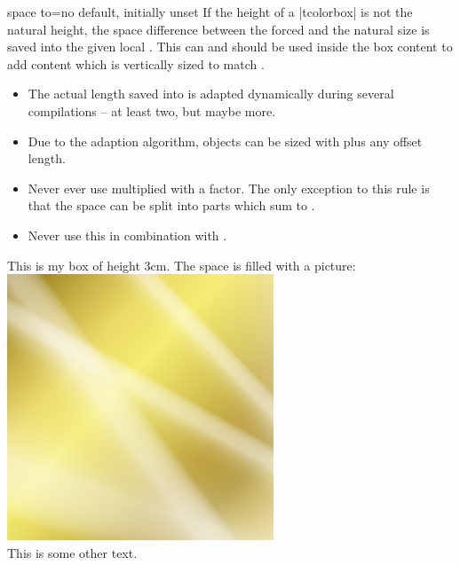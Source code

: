 \begin{docTcbKey}[][doc new=2015-02-15]{space to}{=}{no default, initially unset}
  If the height of a |tcolorbox| is not the natural height, the space
  difference between the forced and the natural size is saved into the
  given local . This  can and should be used inside
  the box content to add content which is vertically sized to match .
  \begin{marker}
    \begin{itemize}
    \item The actual length saved into  is adapted dynamically
      during several compilations -- at least two, but maybe more.
    \item Due to the adaption algorithm, objects can be sized with
       plus any offset length.
    \item Never ever use  multiplied with a factor. The only
      exception to this rule is that the space can be split into parts which
      sum to .
    \item Never use this in combination with .
    \end{itemize}
  \end{marker}
\begin{dispExample}
\begin{tcolorbox}[colframe=blue!75!black,colback=white,height=3cm,
    space to=\myspace]
  This is my box of height 3cm. The space is filled with a picture:\\[2mm]
  \includegraphics[width=\linewidth,height=\myspace]{goldshade.png}\\[1mm]
  This is some other text.
\end{tcolorbox}
\end{dispExample}


\end{docTcbKey}

